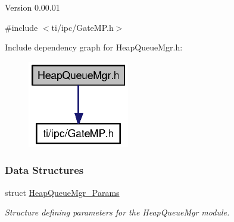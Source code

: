 \begin{DoxyVersion}{Version}
0.00.01 
\end{DoxyVersion}
{\ttfamily \#include $<$ti/ipc/GateMP.h$>$}\par
Include dependency graph for HeapQueueMgr.h:
\nopagebreak
\begin{figure}[H]
\begin{center}
\leavevmode
\includegraphics[width=125pt]{_heap_queue_mgr_8h__incl}
\end{center}
\end{figure}
\subsubsection*{Data Structures}
\begin{DoxyCompactItemize}
\item 
struct \hyperlink{struct_heap_queue_mgr___params}{HeapQueueMgr\_\-Params}
\begin{DoxyCompactList}\small\item\em Structure defining parameters for the HeapQueueMgr module. \item\end{DoxyCompactList}\end{DoxyCompactItemize}
